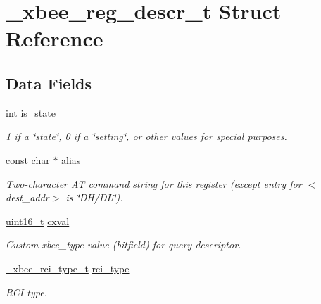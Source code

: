 \hypertarget{struct__xbee__reg__descr__t}{}\section{\+\_\+xbee\+\_\+reg\+\_\+descr\+\_\+t Struct Reference}
\label{struct__xbee__reg__descr__t}
\subsection*{Data Fields}
\begin{DoxyCompactItemize}
\item 
int \hyperlink{struct__xbee__reg__descr__t_ad94e63af9aef7b2c583788852ebdc5b1}{is\+\_\+state}
\begin{DoxyCompactList}\small\item\em 1 if a \char`\"{}state\char`\"{}, 0 if a \char`\"{}setting\char`\"{}, or other values for special purposes. \end{DoxyCompactList}\item 
const char $\ast$ \hyperlink{struct__xbee__reg__descr__t_aae877041546563a319dff9e25bc3aaf7}{alias}
\begin{DoxyCompactList}\small\item\em Two-\/character AT command string for this register (except entry for $<$dest\+\_\+addr$>$ is \char`\"{}\+D\+H/\+D\+L\char`\"{}). \end{DoxyCompactList}\item 
\hyperlink{group__hal__dos_ga5a8b2dc9e45a9ee81a94ef304fb62505}{uint16\+\_\+t} \hyperlink{struct__xbee__reg__descr__t_aa89979f0cabc914d3df82120cb9aa1a4}{cxval}
\begin{DoxyCompactList}\small\item\em Custom xbee\+\_\+type value (bitfield) for query descriptor. \end{DoxyCompactList}\item 
\mbox{\label{struct__xbee__reg__descr__t_a7ae80afc0da97444432fc11aadbcb52d}} 
\hyperlink{group__xbee__atcmd_gaa874b4a291f79f2e80f867ce71fccea5}{\+\_\+xbee\+\_\+rci\+\_\+type\+\_\+t} \hyperlink{struct__xbee__reg__descr__t_a7ae80afc0da97444432fc11aadbcb52d}{rci\+\_\+type}
\begin{DoxyCompactList}\small\item\em R\+CI type. \end{DoxyCompactList}\item 

\end{DoxyCompactItemize}
